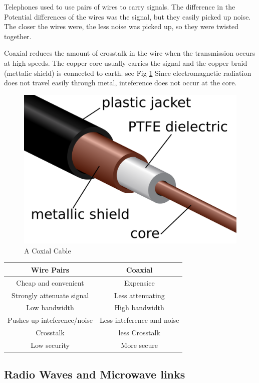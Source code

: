 \documentclass{scrbook}
\begin{document}
	Telephones used to use pairs of wires to carry signals. The difference in the Potential differences of the wires was the signal, but they easily picked up noise. The closer the wires were, the less noise was picked up, so they were twisted together.

	Coaxial reduces the amount of crosstalk in the wire when the transmission occurs at high speeds. The copper core usually carries the signal and the copper braid (mettalic shield) is connected to earth. see Fig \ref{coaxial} Since electromagnetic radiation does not travel easily through metal, inteference does not occur at the core.

	\begin{figure}[t]
		\label{coaxial}
		\caption{A Coxial Cable \cite{wikicomm:coax}}
		\includegraphics[width=\linewidth]{assets/coaxial.png}
	\end{figure}

	\begin{tabular}{| c | c |}
		\hline
		Wire Pairs & Coaxial \\
		\hline 
		Cheap and convenient & Expensice \\
		Strongly attenuate signal & Less attenuating \\ 
		Low bandwidth & High bandwidth \\ 
		Pushes up inteference/noise & Less inteference and noise \\ 
		Crosstalk & less Crosstalk \\ 
		Low security & More secure \\ 
		\hline
	\end{tabular}

\subsection{Radio Waves and Microwave links}
\end{document}
